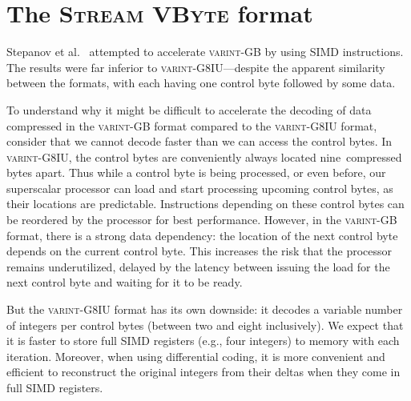\documentclass[compress]{elsarticle}
\newcommand{\vbyte}{VByte}
\newcommand{\varintgb}{\textsc{varint-GB}}
\newcommand{\streamvbyte}{\textsc{Stream \vbyte{}}}
\newcommand{\varintgiu}{\textsc{varint-G8IU}}
\begin{document}
\section{\label{sec:streamvbyte}The \streamvbyte{} format}


 Stepanov et al.~\cite{Stepanov:2011:SDP:2063576.2063627} attempted to
 accelerate \varintgb{} by using SIMD instructions. The results were far inferior to \varintgiu{}---despite the apparent
 similarity between the formats, with each having one control byte followed by some data.


 To understand why it might be difficult to accelerate the decoding of
 data compressed in the \varintgb{} format compared to the \varintgiu{}
 format, consider that we cannot decode faster than we can
 access the control bytes. In \varintgiu{}, the control bytes are
 conveniently always located nine~compressed bytes apart. Thus while a control byte
 is being processed, or even before, our superscalar processor can load
 and start
 processing upcoming control bytes, as their locations are predictable.
 Instructions depending on these control bytes can be reordered by the
 processor for best performance.
However, in the \varintgb{} format, there is a strong data dependency: the
 location of the next control byte depends on the current control byte.
 This increases the risk that the processor remains
 underutilized, delayed by the latency
 between issuing the load for the next control byte and waiting for it to be ready.

But the \varintgiu{} format has its own downside: it decodes a variable
number of integers per control bytes (between two and eight inclusively). We expect that it is faster to store full SIMD registers (e.g., four integers) to memory with each iteration. Moreover, when using differential coding,  it is more convenient and efficient to reconstruct the original integers from their deltas when they come in full SIMD registers.
\end{document}
